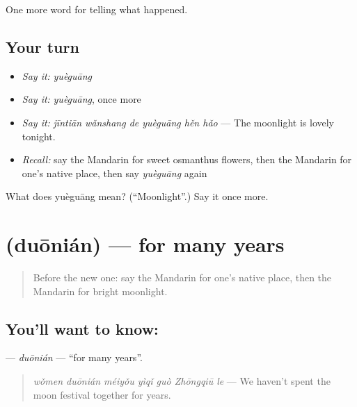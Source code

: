 \begin{grammarlens}[title={What you've built}]
One more word for telling what happened.
\end{grammarlens}

\subsection*{Your turn}
\begin{itemize}
\raggedright
  \item \emph{Say it:} \emph{yuèguāng}
  \item \emph{Say it:} \emph{yuèguāng}, once more
  \item \emph{Say it:} \emph{jīntiān wǎnshang de yuèguāng hěn hǎo} — The moonlight is lovely tonight.
  \item \emph{Recall:} say the Mandarin for sweet osmanthus flowers, then the Mandarin for one's native place, then say \emph{yuèguāng} again
\end{itemize}

\begin{tcolorbox}[breakable,colback=teal!4,colframe=teal!35!black,title={Before you move on}]
What does yuèguāng mean? (\textquotedblleft{}Moonlight\textquotedblright{}.) Say it once more.
\end{tcolorbox}
\section[\texorpdfstring{\zh{多年} (duōnián)}{多年 (duōnián)}]{ (duōnián) — for many years}

\label{lesson:ZH-C343-duonian}



\begin{quote}
Before the new one: say the Mandarin for one's native place, then the Mandarin for bright moonlight.
\end{quote}

\subsection*{You'll want to know: }
\textbf{} — \emph{duōnián} — \textquotedblleft{}for many years\textquotedblright{}.

\begin{quote}
\textbf{} \emph{wǒmen duōnián méiyǒu yìqǐ guò Zhōngqiū le} — We haven't spent the moon festival together for years.
\end{quote}

